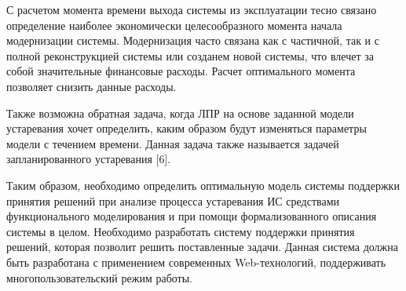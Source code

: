 С расчетом момента времени выхода системы из эксплуатации тесно связано определение наиболее экономически целесообразного момента начала модернизации системы. 
Модернизация часто связана как с частичной, так и с полной реконструкцией системы или созданем новой системы, что влечет за собой значительные финансовые расходы. 
Расчет оптимального момента позволяет снизить данные расходы.

Также возможна обратная задача, когда ЛПР на основе заданной модели устаревания хочет определить, каким образом будут изменяться параметры модели с течением времени. 
Данная задача также называется задачей запланированного устаревания [6].

Таким образом, необходимо определить оптимальную модель системы поддержки принятия решений при анализе процесса устаревания ИС средствами функционального моделирования и при помощи формализованного описания системы в целом. 
Необходимо разработать систему поддержки принятия решений, которая позволит решить поставленные задачи. 
Данная система должна быть разработана с применением современных Web-технологий, поддерживать многопользовательский режим работы.


